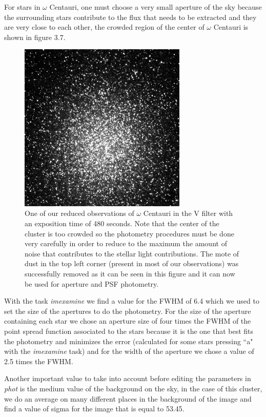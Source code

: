 For stars in $\omega$ Centauri, one must choose a very small aperture of the sky because the surrounding stars contribute to the flux that needs to be extracted and they are very close to each other, the crowded region of the center of $\omega$ Centauri is shown in figure 3.7. 

\begin{figure}[H]
\centering
\includegraphics[width=8cm]{images/NGC5139_red.png}
\caption[NGC5139 as observed in the V filter]{One of our reduced observations of $\omega$ Centauri in the V filter with an exposition time of 480 seconds. Note that the center of the cluster is too crowded so the photometry procedures must be done very carefully in order to reduce to the maximum the amount of noise that contributes to the stellar light contributions. The mote of dust in the top left corner (present in most of our observations) was successfully removed as it can be seen in this figure and it can now be used for aperture and PSF photometry.}
\end{figure}

With the task \textit{imexamine} we find a value for the FWHM of 6.4 which we used to set the size of the apertures to do the photometry. For the size of the aperture containing each star we chose an aperture size of four times the FWHM of the point spread function associated to the stars because it is the one that best fits the photometry and minimizes the error (calculated for some stars pressing ``a" with the \textit{imexamine} task) and for the width of the aperture we chose a value of 2.5 times the FWHM.

Another important value to take into account before editing the parameters in \textit{phot} is the medium value of the background on the sky, in the case of this cluster, we do an average on many different places in the background of the image and find a value of sigma for the image that is equal to 53.45.

